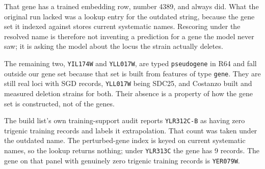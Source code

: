 That gene has a trained embedding row, number 4389, and always did. What the
original run lacked was a lookup entry for the outdated string, because the gene
set it indexed against stores current systematic names. Rescoring under the
resolved name is therefore not inventing a prediction for a gene the model never
saw; it is asking the model about the locus the strain actually deletes.

The remaining two, \texttt{YIL174W} and \texttt{YLL017W}, are typed
\texttt{pseudogene} in R64 and fall outside our gene set because that set is
built from features of type \texttt{gene}. They are still real loci with SGD
records, \texttt{YLL017W} being SDC25, and Costanzo built and measured deletion
strains for both. Their absence is a property of how the gene set is
constructed, not of the genes.

The build list's own training-support audit reports \texttt{YLR312C-B} as having
zero trigenic training records and labels it extrapolation. That count was taken
under the outdated name. The perturbed-gene index is keyed on current systematic
names, so the lookup returns nothing; under \texttt{YLR313C} the gene has 9
records. The gene on that panel with genuinely zero trigenic training records is
\texttt{YER079W}.

